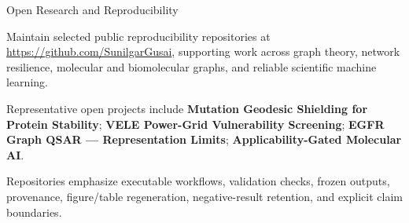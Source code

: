 \begin{rubric}{Open Research and Reproducibility}

\entry*[Portfolio]%
Maintain selected public reproducibility repositories at \url{https://github.com/SunilgarGusai}, supporting work across graph theory, network resilience, molecular and biomolecular graphs, and reliable scientific machine learning.

\entry*[Selected]%
Representative open projects include \textbf{Mutation Geodesic Shielding for Protein Stability}; \textbf{VELE Power-Grid Vulnerability Screening}; \textbf{EGFR Graph QSAR — Representation Limits}; \textbf{Applicability-Gated Molecular AI}.

\entry*[Practice]%
Repositories emphasize executable workflows, validation checks, frozen outputs, provenance, figure/table regeneration, negative-result retention, and explicit claim boundaries.

\end{rubric}
